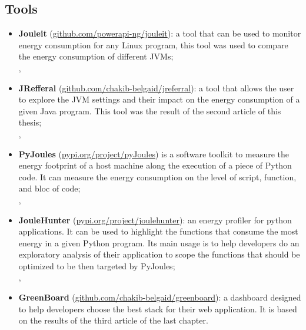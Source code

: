 \subsection*{Tools}
\begin{itemize}
    \item \textbf{Jouleit} (\url{github.com/powerapi-ng/jouleit}): a tool that can be used to monitor energy consumption for any Linux program, this tool was used to compare the energy consumption of different JVMs;
          \\
          ,
    \item \textbf{JRefferal} (\url{github.com/chakib-belgaid/jreferral}): a tool that allows the user to explore the JVM settings and their impact on the energy consumption of a given Java program. This tool was the result of the second article of this thesis;
          \\
          ,
    \item \textbf{PyJoules} (\url{pypi.org/project/pyJoules}) is a software toolkit to measure the energy footprint of a host machine along the execution of a piece of Python code. It can measure the energy consumption on the level of script, function, and bloc of code;
          \\
          ,
    \item \textbf{JouleHunter} (\url{pypi.org/project/joulehunter}): an energy profiler for python applications. It can be used to highlight the functions that consume the most energy in a given Python program. Its main usage is to help developers do an exploratory analysis of their application to scope the functions that should be optimized to be then targeted by PyJoules;
          \\
          ,
    \item \textbf{GreenBoard} (\url{github.com/chakib-belgaid/greenboard}): a dashboard designed to help developers choose the best stack for their web application. It is based on the results of the third article of the last chapter.
\end{itemize}

